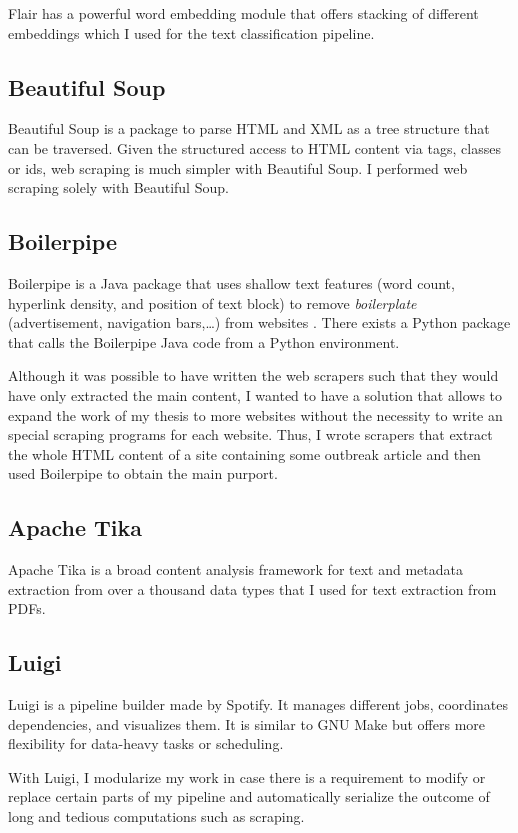   Flair has a powerful word embedding module that offers stacking of different embeddings which I used for the text classification pipeline.

\subsection{Beautiful Soup}
  Beautiful Soup is a package to parse HTML and XML as a tree structure that can be traversed.
  Given the structured access to HTML content via tags, classes or ids, web scraping is much simpler with Beautiful Soup.
  I performed web scraping solely with Beautiful Soup.

\subsection{Boilerpipe}
  Boilerpipe is a Java package that uses shallow text features (word count, hyperlink density, and position of text block) to remove \emph{boilerplate} (advertisement, navigation bars,\dots) from websites \citep{Kohlschutter2010}.
  There exists a Python package that calls the Boilerpipe Java code from a Python environment.

  Although it was possible to have written the web scrapers such that they would have only extracted the main content, I wanted to have a solution that allows to expand the work of my thesis to more websites without the necessity to write an special scraping programs for each website.
  Thus, I wrote scrapers that extract the whole HTML content of a site containing some outbreak article and then used Boilerpipe to obtain the main purport.

\subsection{Apache Tika}\label{Tika}
  Apache Tika is a broad content analysis framework for text and metadata extraction from over a thousand data types that I used for text extraction from PDFs.

\subsection{Luigi}
  Luigi is a pipeline builder made by Spotify.
  It manages different jobs, coordinates dependencies, and visualizes them.
  It is similar to GNU Make but offers more flexibility for data-heavy tasks or scheduling.

  With Luigi, I modularize my work in case there is a requirement to modify or replace certain parts of my pipeline and automatically serialize the outcome of long and tedious computations such as scraping.

